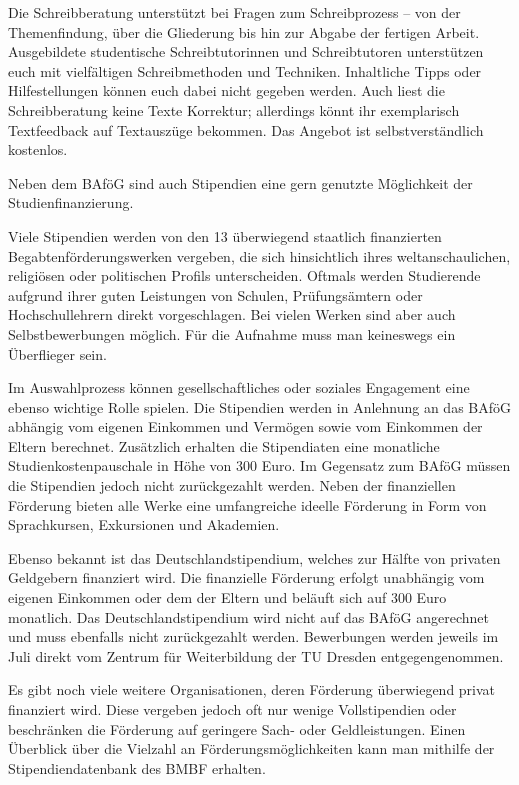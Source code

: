 Die Schreibberatung unterstützt bei Fragen zum Schreibprozess -- von der Themenfindung, über die Gliederung bis hin zur Abgabe der fertigen Arbeit. 
Ausgebildete studentische Schreibtutorinnen und Schreibtutoren unterstützen euch mit vielfältigen Schreibmethoden und Techniken. 
Inhaltliche Tipps oder Hilfestellungen können euch dabei nicht gegeben werden.
Auch liest die Schreibberatung keine Texte Korrektur; allerdings könnt ihr exemplarisch Textfeedback auf Textauszüge bekommen.
Das Angebot ist selbstverständlich kostenlos.


Neben dem BAföG sind auch Stipendien eine gern genutzte Möglichkeit der Studienfinanzierung.

Viele Stipendien werden von den 13 überwiegend staatlich finanzierten Begabtenförderungswerken vergeben, die sich hinsichtlich ihres weltanschaulichen, religiösen oder politischen Profils unterscheiden.
Oftmals werden Studierende aufgrund ihrer guten Leistungen von Schulen, Prüfungsämtern oder Hochschullehrern direkt vorgeschlagen.
Bei vielen Werken sind aber auch Selbstbewerbungen möglich.
Für die Aufnahme muss man keineswegs ein Überflieger sein.

Im Auswahlprozess können gesellschaftliches oder soziales Engagement eine ebenso wichtige Rolle spielen.
Die Stipendien werden in Anlehnung an das BAföG abhängig vom eigenen Einkommen und Vermögen sowie vom Einkommen der Eltern berechnet.
Zusätzlich erhalten die Stipendiaten eine monatliche Studienkostenpauschale in Höhe von 300 Euro.
Im Gegensatz zum BAföG müssen die Stipendien jedoch nicht zurückgezahlt werden.
Neben der finanziellen Förderung bieten alle Werke eine umfangreiche ideelle Förderung in Form von Sprachkursen, Exkursionen und Akademien.

Ebenso bekannt ist das Deutschlandstipendium, welches zur Hälfte von privaten Geldgebern finanziert wird.
Die finanzielle Förderung erfolgt unabhängig vom eigenen Einkommen oder dem der Eltern und beläuft sich auf 300 Euro monatlich.
Das Deutschlandstipendium wird nicht auf das BAföG angerechnet und muss ebenfalls nicht zurückgezahlt werden.
Bewerbungen werden jeweils im Juli direkt vom Zentrum für Weiterbildung der TU Dresden  entgegengenommen.

Es gibt noch viele weitere Organisationen, deren Förderung überwiegend privat finanziert wird. Diese vergeben jedoch oft nur wenige Vollstipendien oder beschränken die Förderung auf geringere Sach- oder Geldleistungen.
Einen Überblick über die Vielzahl an Förderungsmöglichkeiten kann man mithilfe der Stipendiendatenbank des BMBF  erhalten.

